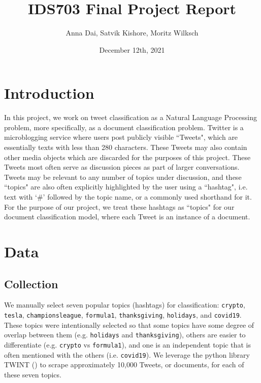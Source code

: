 \documentclass[11pt]{article}
\title{\vspace{-1.5cm}IDS703 Final Project Report}
\author{Anna Dai, Satvik Kishore, Moritz Wilksch}
\date{December 12th, 2021}
\begin{document}
\maketitle


\section{Introduction}

In this project, we work on tweet classification as a Natural Language Processing problem, more specifically, as a document classification problem. Twitter is a microblogging service where users post publicly visible ``Tweets", which are essentially texts with less than 280 characters. These Tweets may also contain other media objects which are discarded for the purposes of this project. These Tweets most often serve as discussion pieces as part of larger conversations. Tweets may be relevant to any number of topics under discussion, and these ``topics" are also often explicitly highlighted by the user using a ``hashtag", i.e. text with `\#' followed by the topic name, or a commonly used shorthand for it. For the purpose of our project, we treat these hashtags as ``topics" for our document classification model, where each Tweet is an instance of a document.

\section{Data}

\subsection{Collection}
We manually select seven popular topics (hashtags) for classification: \texttt{crypto}, \texttt{tesla}, \texttt{championsleague}, \texttt{formula1}, \texttt{thanksgiving}, \texttt{holidays}, and \texttt{covid19}. These topics were intentionally selected so that some topics have some degree of overlap between them (e.g. \texttt{holidays} and \texttt{thanksgiving}), others are easier to differentiate (e.g. \texttt{crypto} vs \texttt{formula1}), and one is an independent topic that is often mentioned with the others (i.e. \texttt{covid19}). We leverage the python library TWINT (\cite{twint}) to scrape approximately 10,000 Tweets, or documents, for each of these seven topics.
\end{document}
